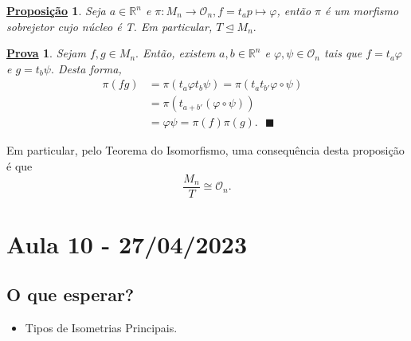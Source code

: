 \documentclass{article}
\newtheorem*{prop*}{\underline{Proposi\c c\~ao}}
\newtheorem*{proof*}{\underline{Prova}}
\renewcommand\qedsymbol{$\blacksquare$}
\begin{document}
\begin{prop*}
  Seja $a\in \mathbb{R}^{n}$ e $\pi :M_{n}\rightarrow \mathcal{O}_{n}, f=t_{a}p\mapsto \varphi $, ent\~ao $\pi $
  \'e um morfismo sobrejetor cujo n\'ucleo \'e T. Em particular, $T\trianglelefteq{M_{n}}.$
\end{prop*}
\begin{proof*}
  Sejam $f, g\in M_{n}.$ Ent\~ao, existem $a, b\in \mathbb{R}^{n}$ e $\varphi , \psi\in \mathcal{O}_{n}$ tais que 
  $f=t_{a}\varphi $ e $g=t_{b}\psi.$ Desta forma, 
 \begin{align*}
   \pi (fg) &= \pi (t_{a}\varphi t_{b}\psi)=\pi (t_{a}t_{b'}\varphi\circ{\psi})&\\
            &=\pi (t_{a+b'}(\varphi\circ{\psi}))\\
            &=\varphi \psi = \pi (f)\pi (g).\text{ \qedsymbol}
 \end{align*}
\end{proof*}
  Em particular, pelo Teorema do Isomorfismo, uma consequ\^encia desta proposi\c c\~ao \'e que 
    $$
      \frac{M_{n}}{T}\cong{\mathcal{O}_{n}}.
    $$
\newpage

\section{Aula 10 - 27/04/2023}
\subsection{O que esperar?}
\begin{itemize}
  \item Tipos de Isometrias Principais.
\end{itemize}
\end{document}
